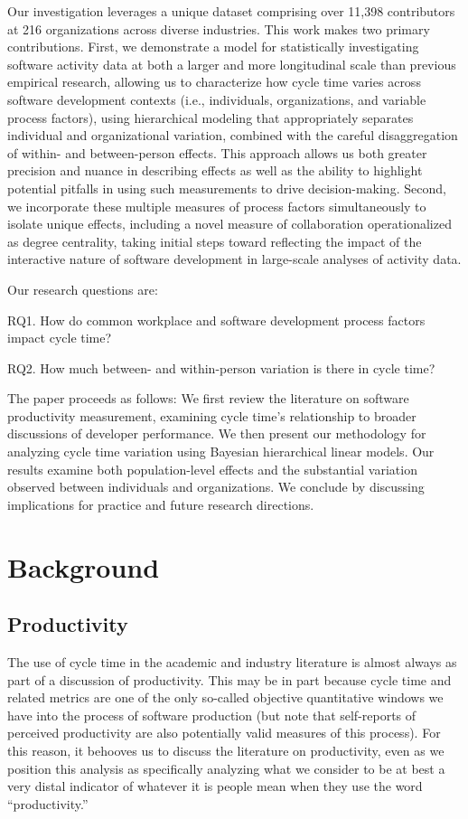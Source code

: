 \documentclass[manuscript,screen,review]{acmart}
\begin{document}
Our investigation leverages a unique dataset comprising over 11,398
contributors at 216 organizations across diverse industries. This work
makes two primary contributions. First, we demonstrate a model for
statistically investigating software activity data at both a larger and
more longitudinal scale than previous empirical research, allowing us to
characterize how cycle time varies across software development contexts
(i.e., individuals, organizations, and variable process factors), using
hierarchical modeling that appropriately separates individual and
organizational variation, combined with the careful disaggregation of
within- and between-person effects. This approach allows us both greater
precision and nuance in describing effects as well as the ability to
highlight potential pitfalls in using such measurements to drive
decision-making. Second, we incorporate these multiple measures of
process factors simultaneously to isolate unique effects, including a
novel measure of collaboration operationalized as degree centrality,
taking initial steps toward reflecting the impact of the interactive
nature of software development in large-scale analyses of activity data.

Our research questions are:

RQ1. How do common workplace and software development process factors
impact cycle time?

RQ2. How much between- and within-person variation is there in cycle
time?

The paper proceeds as follows: We first review the literature on
software productivity measurement, examining cycle time's relationship
to broader discussions of developer performance. We then present our
methodology for analyzing cycle time variation using Bayesian
hierarchical linear models. Our results examine both population-level
effects and the substantial variation observed between individuals and
organizations. We conclude by discussing implications for practice and
future research directions.

\section{Background}\label{background}

\subsection{Productivity}\label{productivity}

The use of cycle time in the academic and industry literature is almost
always as part of a discussion of productivity. This may be in part
because cycle time and related metrics are one of the only so-called
objective quantitative windows we have into the process of software
production (but note that self-reports of perceived productivity are
also potentially valid measures of this process). For this reason, it
behooves us to discuss the literature on productivity, even as we
position this analysis as specifically analyzing what we consider to be
at best a very distal indicator of whatever it is people mean when they
use the word ``productivity.''
\end{document}
